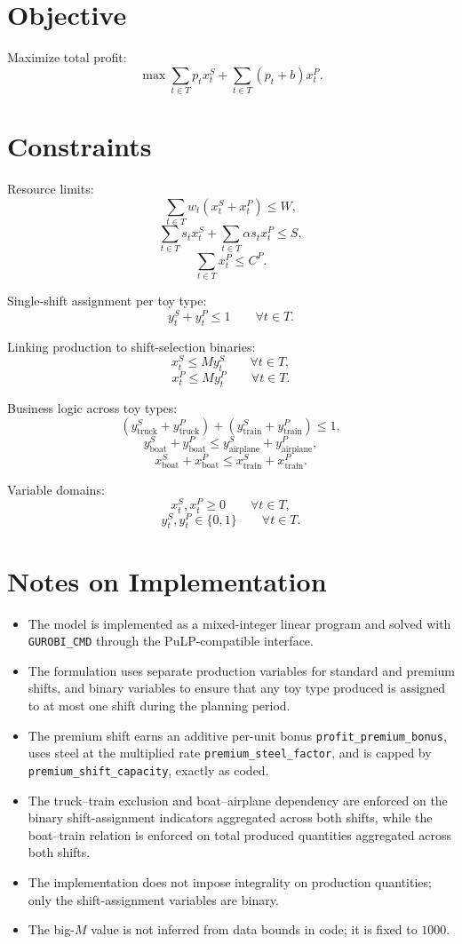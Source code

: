 \section*{Objective}

Maximize total profit:
\[
\max \sum_{t \in T} p_t x^S_t + \sum_{t \in T} (p_t + b)x^P_t.
\]

\section*{Constraints}

Resource limits:
\[
\sum_{t \in T} w_t(x^S_t + x^P_t) \le W,
\]
\[
\sum_{t \in T} s_t x^S_t + \sum_{t \in T} \alpha s_t x^P_t \le S,
\]
\[
\sum_{t \in T} x^P_t \le C^P.
\]

Single-shift assignment per toy type:
\[
y^S_t + y^P_t \le 1 \qquad \forall t \in T.
\]

Linking production to shift-selection binaries:
\[
x^S_t \le M y^S_t \qquad \forall t \in T,
\]
\[
x^P_t \le M y^P_t \qquad \forall t \in T.
\]

Business logic across toy types:
\[
(y^S_{\text{truck}} + y^P_{\text{truck}}) + (y^S_{\text{train}} + y^P_{\text{train}}) \le 1,
\]
\[
y^S_{\text{boat}} + y^P_{\text{boat}} \le y^S_{\text{airplane}} + y^P_{\text{airplane}},
\]
\[
x^S_{\text{boat}} + x^P_{\text{boat}} \le x^S_{\text{train}} + x^P_{\text{train}}.
\]

Variable domains:
\[
x^S_t, x^P_t \ge 0 \qquad \forall t \in T,
\]
\[
y^S_t, y^P_t \in \{0,1\} \qquad \forall t \in T.
\]

\section*{Notes on Implementation}

\begin{itemize}
    \item The model is implemented as a mixed-integer linear program and solved with \texttt{GUROBI\_CMD} through the PuLP-compatible interface.
    \item The formulation uses separate production variables for standard and premium shifts, and binary variables to ensure that any toy type produced is assigned to at most one shift during the planning period.
    \item The premium shift earns an additive per-unit bonus \texttt{profit\_premium\_bonus}, uses steel at the multiplied rate \texttt{premium\_steel\_factor}, and is capped by \texttt{premium\_shift\_capacity}, exactly as coded.
    \item The truck--train exclusion and boat--airplane dependency are enforced on the binary shift-assignment indicators aggregated across both shifts, while the boat--train relation is enforced on total produced quantities aggregated across both shifts.
    \item The implementation does not impose integrality on production quantities; only the shift-assignment variables are binary.
    \item The big-$M$ value is not inferred from data bounds in code; it is fixed to $1000$.
\end{itemize}
